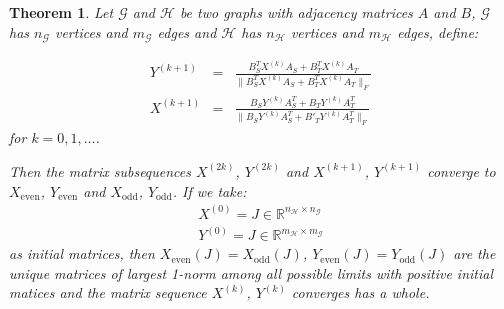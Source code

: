 \documentclass[a4paper,11pt]{report}
\newtheorem{theorem}{Theorem}[section]
\newcommand{\R}{{\mathbb R}}
\newcommand{\graf}{\mathscr{G}}
\newcommand{\grafeen}{\mathscr{H}}
\begin{document}
 \begin{theorem}\label{edgegrootbewijs}
   Let $\graf$ and $\grafeen$ be two graphs with adjacency matrices $A$ and $B$, $\graf$ has $n_\graf$ vertices and
   $m_\graf$ edges and $\grafeen$ has $n_\grafeen$ vertices and $m_\grafeen$ edges, define: 


   
 \begin{eqnarray}
  Y^{(k+1)} &=& \frac{B_S^TX^{(k)}A_S + B_T^TX^{(k)}A_T}{\|B_S^TX^{(k)}A_S + 
  B_T^TX^{(k)}A_T\|_F}\label{edgegroot1}\\
   X^{(k+1)} &=& \frac{B_SY^{(k)}A_S^T + B_TY^{(k)}A^T_T}{\|B_SY^{(k)}A_S^T + 
   B'_TY^{(k)}A^T_T\|_F}\label{edgegroot2}
 \end{eqnarray}
  for  $k =  0,1,\ldots$.
  
  Then the matrix subsequences $X^{(2k)}$, $Y^{(2k)}$ and $X^{(k+1)}$, $Y^{(k+1)}$ 
  converge to $X_{\text{even}}$, $Y_{\text{even}}$ and $X_{\text{odd}}$, 
  $Y_{\text{odd}}$. If we take:
  \begin{eqnarray*}  X^{(0)} = J \in \R^{n_\grafeen \times n_\graf}\\
    Y^{(0)} = J \in \R^{m_\grafeen \times m_\graf}
  \end{eqnarray*}
 as initial matrices, then $X_{\text{even}}(J)=X_{\text{odd}}(J)$, $Y_{\text{even}}(J)= Y_{\text{odd}}(J)$ 
 are the unique matrices of largest 1-norm among all possible limits with positive 
 initial matices and the matrix sequence $X^{(k)}$, $Y^{(k)}$ converges has a 
 whole.
  \end{theorem}
\end{document}
